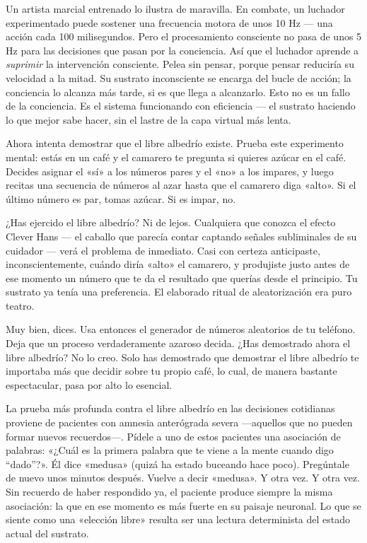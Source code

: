 \documentclass[11pt, twoside, openright]{book}
\begin{document}
Un artista marcial entrenado lo ilustra de maravilla. En combate, un luchador experimentado puede sostener una frecuencia motora de unos 10 Hz --- una acción cada 100 milisegundos. Pero el procesamiento consciente no pasa de unos 5 Hz para las decisiones que pasan por la conciencia. Así que el luchador aprende a \textit{suprimir} la intervención consciente. Pelea sin pensar, porque pensar reduciría su velocidad a la mitad. Su sustrato inconsciente se encarga del bucle de acción; la conciencia lo alcanza más tarde, si es que llega a alcanzarlo. Esto no es un fallo de la conciencia. Es el sistema funcionando con eficiencia --- el sustrato haciendo lo que mejor sabe hacer, sin el lastre de la capa virtual más lenta.

Ahora intenta demostrar que el libre albedrío existe. Prueba este experimento mental: estás en un café y el camarero te pregunta si quieres azúcar en el café. Decides asignar el «sí» a los números pares y el «no» a los impares, y luego recitas una secuencia de números al azar hasta que el camarero diga «alto». Si el último número es par, tomas azúcar. Si es impar, no.

¿Has ejercido el libre albedrío? Ni de lejos. Cualquiera que conozca el efecto Clever Hans --- el caballo que parecía contar captando señales subliminales de su cuidador --- verá el problema de inmediato. Casi con certeza anticipaste, inconscientemente, cuándo diría «alto» el camarero, y produjiste justo antes de ese momento un número que te da el resultado que querías desde el principio. Tu sustrato ya tenía una preferencia. El elaborado ritual de aleatorización era puro teatro.

Muy bien, dices. Usa entonces el generador de números aleatorios de tu teléfono. Deja que un proceso verdaderamente azaroso decida. ¿Has demostrado ahora el libre albedrío? No lo creo. Solo has demostrado que demostrar el libre albedrío te importaba más que decidir sobre tu propio café, lo cual, de manera bastante espectacular, pasa por alto lo esencial.

La prueba más profunda contra el libre albedrío en las decisiones cotidianas proviene de pacientes con amnesia anterógrada severa ---aquellos que no pueden formar nuevos recuerdos---. Pídele a uno de estos pacientes una asociación de palabras: «¿Cuál es la primera palabra que te viene a la mente cuando digo ``dado''?». Él dice «medusa» (quizá ha estado buceando hace poco). Pregúntale de nuevo unos minutos después. Vuelve a decir «medusa». Y otra vez. Y otra vez. Sin recuerdo de haber respondido ya, el paciente produce siempre la misma asociación: la que en ese momento es más fuerte en su paisaje neuronal. Lo que se siente como una «elección libre» resulta ser una lectura determinista del estado actual del sustrato.
\end{document}

